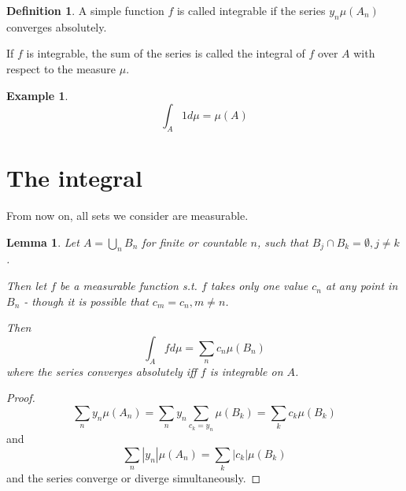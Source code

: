 \documentclass[11pt,a4paper]{report}
\newtheorem{lemma}[theorem]{Lemma}
\theoremstyle{plain}
\theoremstyle{definition}
\newtheorem*{defn}{Definition}
\newtheorem*{eg}{Example}
\theoremstyle{remark}
\newcommand{\intersection}{\cap}
\newcommand{\Union}{\bigcup}
\newcommand{\abs}[1]{\left| #1 \right|}
\begin{document}
\begin{defn}
    A simple function $f$ is called integrable if the series $y_n\mu(A_n)$ converges absolutely.

    If $f$ is integrable, the sum of the series is called the integral of $f$ over $A$ with respect to the measure $\mu$.
\end{defn}

\begin{eg}
    $$ \int_A 1 d\mu = \mu(A) $$
\end{eg}

\section{The integral}

From now on, all sets we consider are measurable.

\begin{lemma}
    Let $A = \Union_n B_n$ for finite or countable $n$, such that $B_j \intersection B_k = \emptyset, j \ne k$.

    Then let $f$ be a measurable function s.t. $f$ takes only one value $c_n$ at any point in $B_n$ - though it is possible that $c_m = c_n, m \ne n$.

    Then
    $$ \int_A f d\mu = \sum_n c_n \mu(B_n) $$
    where the series converges absolutely iff $f$ is integrable on $A$.
\end{lemma}

\begin{proof}
    $$ \sum_n y_n \mu(A_n) = \sum_n y_n \sum_{c_k = y_n} \mu(B_k) = \sum_k c_k \mu(B_k) $$
    and
    $$ \sum_n \abs{y_n} \mu(A_n) = \sum_k \abs{c_k} \mu(B_k) $$
    and the series converge or diverge simultaneously.
\end{proof}

\end{document}
